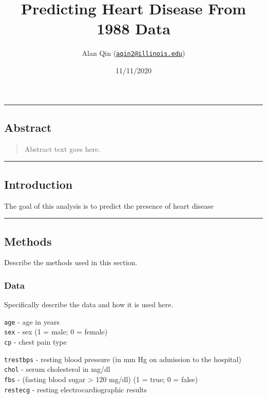 \documentclass[
]{article}
\title{Predicting Heart Disease From 1988 Data}
\author{Alan Qin
(\href{mailto:aqin2@illinois.edu}{\nolinkurl{aqin2@illinois.edu}})}
\date{11/11/2020}
\begin{document}
\maketitle

{
\setcounter{tocdepth}{2}
\tableofcontents
}
\begin{center}\rule{0.5\linewidth}{0.5pt}\end{center}

\hypertarget{abstract}{%
\subsection{Abstract}\label{abstract}}

\begin{quote}
Abstract text goes here.
\end{quote}

\begin{center}\rule{0.5\linewidth}{0.5pt}\end{center}

\hypertarget{introduction}{%
\subsection{Introduction}\label{introduction}}

The goal of this analysis is to predict the presence of heart disease

\begin{center}\rule{0.5\linewidth}{0.5pt}\end{center}

\hypertarget{methods}{%
\subsection{Methods}\label{methods}}

Describe the methods used in this section.

\hypertarget{data}{%
\subsubsection{Data}\label{data}}

Specifically describe the data and how it is used here.

\texttt{age} - age in years~\\
\texttt{sex} - sex (1 = male; 0 = female)~\\
\texttt{cp} - chest pain type ~

\texttt{trestbps} - resting blood pressure (in mm Hg on admission to the
hospital) ~\\
\texttt{chol} - serum cholesterol in mg/dl~\\
\texttt{fbs} - (fasting blood sugar \textgreater{} 120 mg/dl) (1 = true;
0 = false)~\\
\texttt{restecg} - resting electrocardiographic results~
\end{document}
